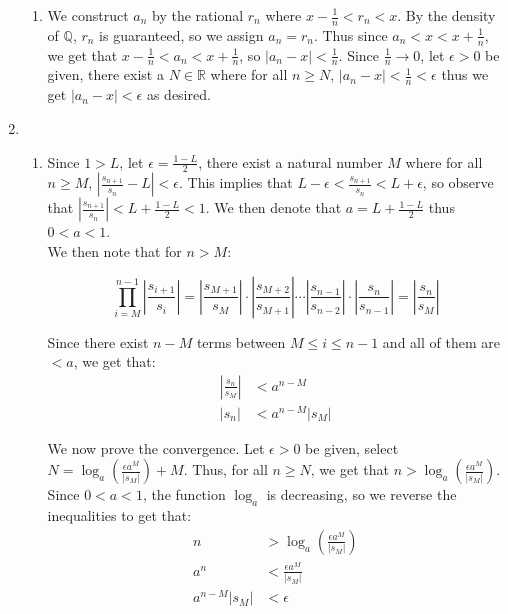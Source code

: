 \documentclass{article}
\begin{document}
\begin{enumerate}
\begin{enumerate}[label=(\alph*)]
        \item 
        We construct $a_n$ by the rational $r_n$ where $x - \frac{1}{n} < r_n < x $. By the density of $\mathbb{Q}$, $r_n$ is guaranteed, so we assign $a_n = r_n$. Thus since $a_n < x < x + \frac{1}{n}$, we get that $x - \frac{1}{n} < a_n < x + \frac{1}{n}$, so $|a_n - x| < \frac{1}{n}$. Since $\frac{1}{n} \rightarrow 0$, let $\epsilon > 0$ be given, there exist a $N \in \mathbb{R}$ where for all $n \geq N$, $|a_n - x| < \frac{1}{n} < \epsilon$ thus we get $|a_n - x|  < \epsilon$ as desired.
        
    \end{enumerate}
    \newpage

    
    \item
    \begin{enumerate}[label=(\alph*)]
    
    \item
    Since $1 > L$, let $\epsilon = \frac{1 - L}{2}$, there exist a natural number $M$ where for all $n \geq M$, $|\frac{s_{n+1}}{s_n} -L| < \epsilon$. This implies that $L - \epsilon < \frac{s_{n+1}}{s_n} < L + \epsilon$, so observe that $|\frac{s_{n+1}}{s_n}| < L + \frac{1 - L}{2} < 1$. We then denote that $a = L + \frac{1 - L}{2}$ thus $0 < a < 1$. \\

    We then note that for $n > M$: 

    $$\prod_{i = M}^{n - 1} |\frac{s_{i+1}}{s_i}| = |\frac{s_{M+1}}{s_M}| \cdot |\frac{s_{M+2}}{s_{M+1}}|\cdots|\frac{s_{n-1}}{s_{n-2}}|\cdot|\frac{s_{n}}{s_{n-1}}| = |\frac{s_n}{s_M}|$$

    Since there exist $n - M$ terms between $M \leq i \leq n - 1$ and all of them are $<a$, we get that: 
    \begin{align*}
        |\frac{s_n}{s_M}| &< a^{n-M}\\
        |s_n| &< a^{n-M}|s_M|
    \end{align*}

    We now prove the convergence. Let $\epsilon > 0$ be given, select $N = \log_a(\frac{\epsilon a^M}{|s_M|}) + M$. Thus, for all $n \geq N$, we get that $n > \log_a(\frac{\epsilon a^M}{|s_M|})$. Since $0 < a < 1$, the function $\log_a$ is decreasing, so we reverse the inequalities to get that: 
    \begin{align*}
    n &> \log_a(\frac{\epsilon a^M}{|s_M|}) \\
    a^{n} &< \frac{\epsilon a^M}{|s_M|} \\
    a^{n - M}|s_M| &< \epsilon
    \end{align*}


\end{enumerate}
\end{enumerate}
\end{document}
